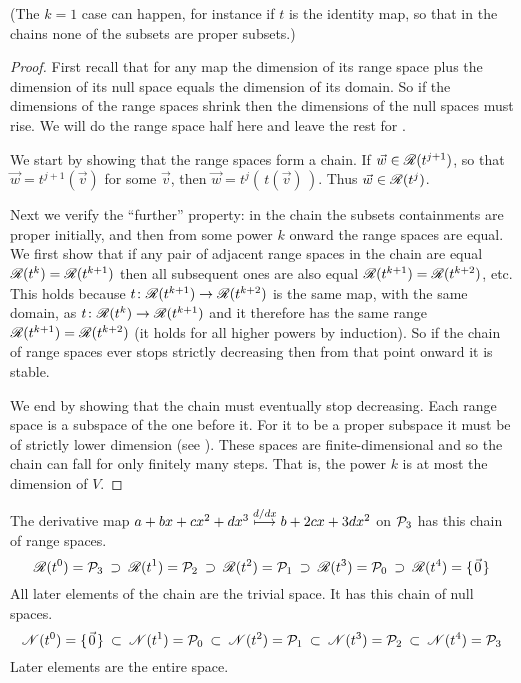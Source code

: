 \noindent (The $k=1$ case can happen, for instance if $t$ is the identity map,
so that in the chains none of the subsets are proper subsets.)

\begin{proof}
First recall that for any map the dimension of its range space
plus the dimension of its null space equals
the dimension of its domain.
So if the dimensions of the range spaces shrink then the 
dimensions of the null spaces must rise.
We will do the range space half here and leave the rest for
.

We start by showing 
that the range spaces form a chain.
If $\vec{w}\in\mathscr{R}(t^{j+1})$, so that
$\vec{w}=t^{j+1}(\vec{v})$ for some $\vec{v}$, 
then $\vec{w}=t^{j}(\,t(\vec{v})\,)$.
Thus $\vec{w}\in\mathscr{R}(t^{j})$.

Next we verify the ``further'' property:
in the chain the subsets containments are proper 
initially, and then from some power $k$ onward the range spaces are equal. 
We first show that if any pair of adjacent range spaces in the
chain are equal \( \mathscr{R}(t^{k})=\mathscr{R}(t^{k+1}) \)
then all subsequent ones are also equal
\( \mathscr{R}(t^{k+1})=\mathscr{R}(t^{k+2}) \), etc.
This holds because
\( \mbox{$t\colon \mathscr{R}(t^{k+1})\to \mathscr{R}(t^{k+2})$} \)
is the same map, with the same domain, as
\( \mbox{$t\colon \mathscr{R}(t^{k})\to \mathscr{R}(t^{k+1})$} \) and
it therefore has the same range
\( \mathscr{R}(t^{k+1})=\mathscr{R}(t^{k+2}) \)
(it holds for all higher powers by induction).
So if the chain of range spaces ever stops strictly decreasing then
from that point onward it is stable.

We end by showing that the chain must eventually stop decreasing. 
Each range space is a subspace of the one before it.
For it to be a proper subspace it must be of strictly lower dimension
(see ).
These spaces are finite-dimensional and so the chain can fall for only
finitely many steps.
That is, the power $k$ is at most the dimension of $V$.
\end{proof}

\begin{example}
The derivative map $a+bx+cx^2+dx^3\stackrel{d/dx}{\longmapsto} b+2cx+3dx^2$
on $\mathcal{P}_3$ has this chain of range spaces.
\begin{equation*}
  \mathscr{R}(t^0)=\mathcal{P}_3
    \:\supset\:\mathscr{R}(t^1)=\mathcal{P}_2
    \:\supset\:\mathscr{R}(t^2)=\mathcal{P}_1
    \:\supset\:\mathscr{R}(t^3)=\mathcal{P}_0
    \:\supset\:\mathscr{R}(t^4)=\mbox{$\{\hspace{0.1em}\vec{0}\hspace{0.1em}\}$}
\end{equation*}
All later elements of the chain are the trivial space. 
It has this chain of null spaces.
\begin{equation*}
  \mathscr{N}(t^0)=\mbox{$\{\hspace{0.1em}\vec{0}\hspace{0.1em}\}$}
  \:\subset\: \mathscr{N}(t^1)=\mathcal{P}_0
  \:\subset\:\mathscr{N}(t^2)=\mathcal{P}_1
  \:\subset\:\mathscr{N}(t^3)=\mathcal{P}_2
  \:\subset\:\mathscr{N}(t^4)=\mathcal{P}_3
\end{equation*}
Later elements are the entire space.
\end{example}

